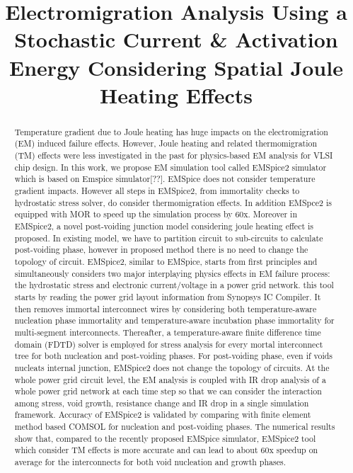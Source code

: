 \documentclass[conference]{IEEEtran}
\begin{document}
\title{Electromigration Analysis Using a Stochastic Current \& Activation Energy Considering Spatial Joule Heating
Effects}


\maketitle
\raggedbottom
\begin{abstract}
  
  Temperature gradient due to Joule heating has huge impacts on the
  electromigration (EM) induced failure effects. However, Joule
  heating and related thermomigration (TM) effects were less
  investigated in the past for physics-based EM analysis for VLSI chip
  design. In this work, we propose EM simulation tool called EMSpice2
  simulator which is based on Emspice simulator[??]. EMSpice does not consider temperature gradient impacts. However all steps in EMSpice2,
  from immortality checks to hydrostatic stress solver, do consider thermomigration effects. In addition EMSpce2 is equipped with MOR to speed up the simulation process by 60x. Moreover in EMSpice2, a novel post-voiding junction model
  considering joule heating effect is proposed.  In existing model, we have to
  partition circuit to sub-circuits to calculate post-voiding phase,
  however in proposed method there is no need to change the topology
  of circuit.
EMSpice2, similar to EMSpice, starts from first principles and simultaneously considers two major interplaying physics effects in EM failure process: the hydrostatic stress and electronic current/voltage in a power grid network. this tool starts by reading the power grid layout information from
Synopsys IC Compiler. It then removes immortal interconnect
wires by considering both temperature-aware nucleation phase immortality and temperature-aware
incubation phase immortality for multi-segment interconnects.
Thereafter, a temperature-aware finite difference time domain (FDTD) solver is
employed for stress analysis for every mortal interconnect tree
for both nucleation and post-voiding phases. For post-voiding phase, even if voids nucleats internal junction, EMSpice2 does not change the topology of circuits. At the whole power
grid circuit level, the EM analysis is coupled with IR drop
analysis of a whole power grid network at each time step so
that we can consider the interaction among stress, void growth,
resistance change and IR drop in a single simulation framework.
Accuracy of EMSpice2 is validated by comparing with finite
element method based COMSOL for nucleation and post-voiding phases.
The numerical results show
that, compared to the recently proposed EMSpice
simulator, EMSpice2 tool which consider TM effects is more accurate and can lead to about 60x speedup on
average for the interconnects for both
void nucleation and growth phases.
  

\end{abstract}
\end{document}
